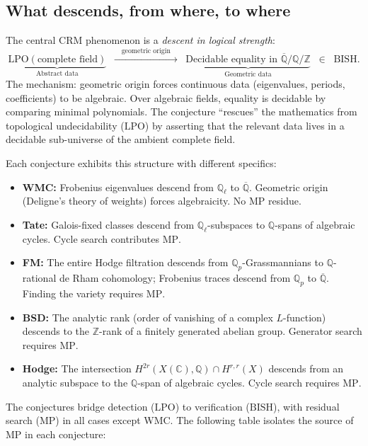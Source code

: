 \documentclass[11pt]{article}
\theoremstyle{definition}
\theoremstyle{remark}
\newcommand{\Z}{\mathbb{Z}}
\newcommand{\Q}{\mathbb{Q}}
\newcommand{\C}{\mathbb{C}}
\newcommand{\Qbar}{\overline{\Q}}
\newcommand{\Qell}{\Q_\ell}
\newcommand{\Qp}{\Q_p}
\newcommand{\LPO}{\mathrm{LPO}}
\newcommand{\MP}{\mathrm{MP}}
\newcommand{\BISH}{\mathrm{BISH}}
\newcommand{\CRM}{\mathrm{CRM}}
\begin{document}
\subsection{What descends, from where, to where}

The central $\CRM$ phenomenon is a \emph{descent in logical strength}:
\[
\underbrace{\LPO(\text{complete field})}_{\text{Abstract data}} \;\;\xrightarrow{\quad\text{geometric origin}\quad}\;\; \underbrace{\text{Decidable equality in }\Qbar/\Q/\Z}_{\text{Geometric data}} \;\;\in\;\; \BISH.
\]
The mechanism: geometric origin forces continuous data (eigenvalues, periods, coefficients) to be algebraic. Over algebraic fields, equality is decidable by comparing minimal polynomials. The conjecture ``rescues'' the mathematics from topological undecidability ($\LPO$) by asserting that the relevant data lives in a decidable sub-universe of the ambient complete field.

Each conjecture exhibits this structure with different specifics:
\begin{itemize}
\item \textbf{WMC:} Frobenius eigenvalues descend from $\Qell$ to $\Qbar$. Geometric origin (Deligne's theory of weights) forces algebraicity. No $\MP$ residue.
\item \textbf{Tate:} Galois-fixed classes descend from $\Qell$-subspaces to $\Q$-spans of algebraic cycles. Cycle search contributes $\MP$.
\item \textbf{FM:} The entire Hodge filtration descends from $\Qp$-Grassmannians to $\Q$-rational de Rham cohomology; Frobenius traces descend from $\Qp$ to $\Qbar$. Finding the variety requires $\MP$.
\item \textbf{BSD:} The analytic rank (order of vanishing of a complex $L$-function) descends to the $\Z$-rank of a finitely generated abelian group. Generator search requires $\MP$.
\item \textbf{Hodge:} The intersection $H^{2r}(X(\C), \Q) \cap H^{r,r}(X)$ descends from an analytic subspace to the $\Q$-span of algebraic cycles. Cycle search requires $\MP$.
\end{itemize}
The conjectures bridge detection ($\LPO$) to verification ($\BISH$), with residual search ($\MP$) in all cases except WMC. The following table isolates the source of $\MP$ in each conjecture:
\end{document}
